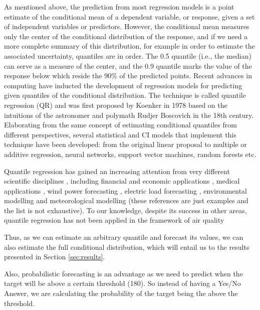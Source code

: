 \documentclass[a4paper,twocolumn,5p]{elsarticle}
\begin{document}
As mentioned above, the prediction from most regression models is a
point estimate of the conditional mean of a dependent variable, or
response, given a set of independent variables or predictors. However,
the conditional mean measures only the center of the conditional
distribution of the response, and if we need a more complete summary
of this distribution, for example in order to estimate the associated
uncertainty, quantiles are in order. The 0.5 quantile (i.e., the
median) can serve as a measure of the center, and the 0.9 quantile
marks the value of the response below which reside the 90\% of the
predicted points. Recent advances in computing have inducted the
development of regression models for predicting given quantiles of the
conditional distribution. The technique is called quantile regression
(QR) and was first proposed by Koenker in 1978
\cite{koenker_regression_1978} based on the intuitions of the
astronomer and polymath Rudjer Boscovich in the 18th
century. Elaborating from the same concept of estimating conditional
quantiles from different perspectives, several statistical and CI
models that implement this technique have been developed: from the
original linear proposal to multiple or additive regression, neural
networks, support vector machines, random forests etc.

Quantile regression has gained an increasing attention from very
different scientific disciplines \cite{yu_quantile_2003}, including
financial and economic applications \cite{fitzenberger_economic_2002},
medical applications \cite{soyiri_forecasting_2012}, wind power
forecasting \cite{zhang_review_2014}, electric load forecasting
\cite{7423794,gibbons_quantile_2014}, environmental modelling
\cite{cade_gentle_2003} and meteorological modelling
\cite{bjornar_bremnes_probabilistic_2004} (these references are just
examples and the list is not exhaustive). To our knowledge, despite
its success in other areas, quantile regression has not been applied
in the framework of air quality%

Thus, as we can estimate an arbitrary quantile and forecast its
values, we can also estimate the full conditional distribution, which
will entail us to the results presented in Section \ref{sec:results}.

Also, probabilistic forecasting is an advantage as we need to predict 
when the target will be above a certain threshold (180). So instead of having a 
Yes/No Answer, we are calculating the probability of the target being the above 
the threshold.
\end{document}
